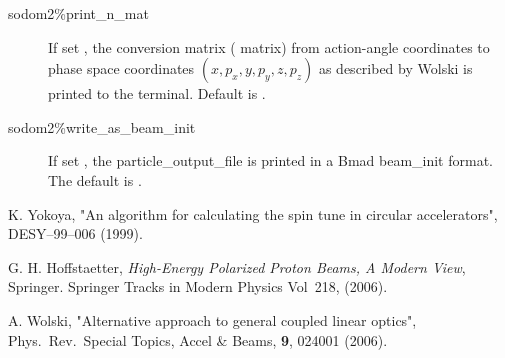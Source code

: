 \documentclass{hitec}     %
\begin{document}
\begin{description}
\item[sodom2\%print_n_mat] \Newline
If set , the conversion matrix ( matrix) from action-angle coordinates to phase space coordinates $(x, p_x, y, p_y,z, p_z)$ as described by Wolski \cite{b:wolski} is printed to the terminal. Default is .

\item[sodom2\%write_as_beam_init]\Newline
If set , the particle_output_file is printed in a Bmad beam_init format. The default is .

\end{description}

\begin{thebibliography}{9}
K. Yokoya, "An algorithm for calculating the spin tune in circular accelerators",
DESY–99–006 (1999).

G. H. Hoffstaetter, 
{\it High-Energy Polarized Proton Beams, A Modern View}, 
Springer. Springer Tracks in Modern Physics Vol~218, (2006).

A. Wolski, "Alternative approach to general coupled linear optics",
Phys.\ Rev.\ Special Topics, Accel \& Beams, {\bf 9}, 024001 (2006).

\end{thebibliography}
\end{document}
